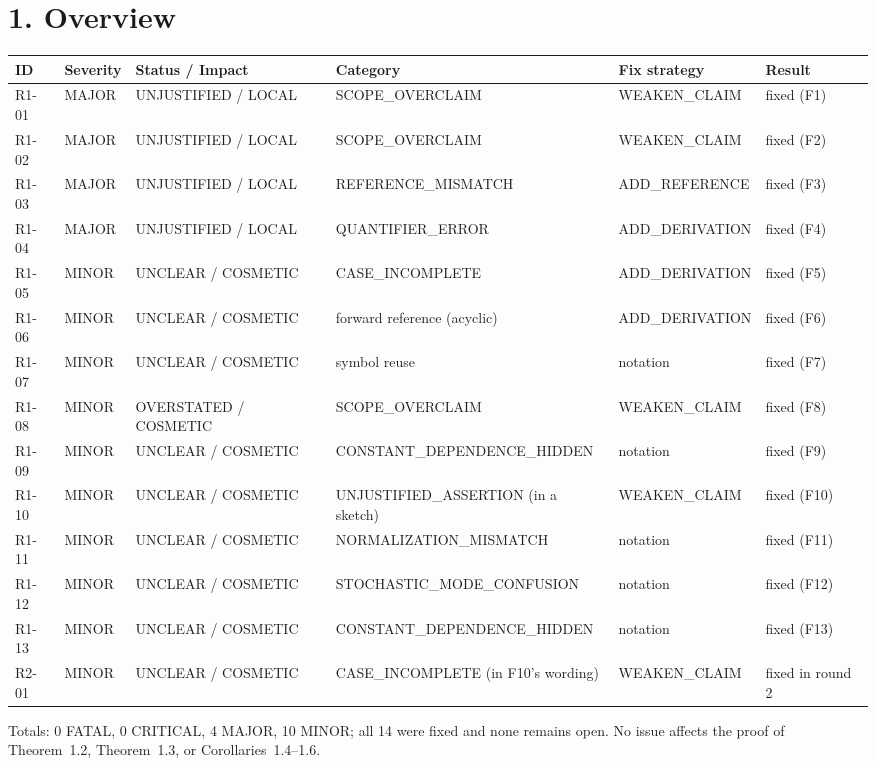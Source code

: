 \documentclass[10pt]{article}
\begin{document}
\section*{1. Overview}
{\footnotesize

\begin{longtable}{@{}>{\raggedright\arraybackslash}p{}>{\raggedright\arraybackslash}p{}>{\raggedright\arraybackslash}p{}>{\raggedright\arraybackslash}p{}>{\raggedright\arraybackslash}p{}>{\raggedright\arraybackslash}p{}@{}}
\toprule
ID & Severity & Status / Impact & Category & Fix strategy & Result\\
\midrule
\endhead
R1-01 & MAJOR & UNJUSTIFIED / LOCAL & SCOPE\_\allowbreak{}OVERCLAIM & WEAKEN\_\allowbreak{}CLAIM & fixed (F1)\\
R1-02 & MAJOR & UNJUSTIFIED / LOCAL & SCOPE\_\allowbreak{}OVERCLAIM & WEAKEN\_\allowbreak{}CLAIM & fixed (F2)\\
R1-03 & MAJOR & UNJUSTIFIED / LOCAL & REFERENCE\_\allowbreak{}MISMATCH & ADD\_\allowbreak{}REFERENCE & fixed (F3)\\
R1-04 & MAJOR & UNJUSTIFIED / LOCAL & QUANTIFIER\_\allowbreak{}ERROR & ADD\_\allowbreak{}DERIVATION & fixed (F4)\\
R1-05 & MINOR & UNCLEAR / COSMETIC & CASE\_\allowbreak{}INCOMPLETE & ADD\_\allowbreak{}DERIVATION & fixed (F5)\\
R1-06 & MINOR & UNCLEAR / COSMETIC & forward reference (acyclic) & ADD\_\allowbreak{}DERIVATION & fixed (F6)\\
R1-07 & MINOR & UNCLEAR / COSMETIC & symbol reuse & notation & fixed (F7)\\
R1-08 & MINOR & OVERSTATED / COSMETIC & SCOPE\_\allowbreak{}OVERCLAIM & WEAKEN\_\allowbreak{}CLAIM & fixed (F8)\\
R1-09 & MINOR & UNCLEAR / COSMETIC & CONSTANT\_\allowbreak{}DEPENDENCE\_\allowbreak{}HIDDEN & notation & fixed (F9)\\
R1-10 & MINOR & UNCLEAR / COSMETIC & UNJUSTIFIED\_\allowbreak{}ASSERTION (in a sketch) & WEAKEN\_\allowbreak{}CLAIM & fixed (F10)\\
R1-11 & MINOR & UNCLEAR / COSMETIC & NORMALIZATION\_\allowbreak{}MISMATCH & notation & fixed (F11)\\
R1-12 & MINOR & UNCLEAR / COSMETIC & STOCHASTIC\_\allowbreak{}MODE\_\allowbreak{}CONFUSION & notation & fixed (F12)\\
R1-13 & MINOR & UNCLEAR / COSMETIC & CONSTANT\_\allowbreak{}DEPENDENCE\_\allowbreak{}HIDDEN & notation & fixed (F13)\\
R2-01 & MINOR & UNCLEAR / COSMETIC & CASE\_\allowbreak{}INCOMPLETE (in F10's wording) & WEAKEN\_\allowbreak{}CLAIM & fixed in round 2\\
\bottomrule
\end{longtable}

}
\noindent Totals: 0 FATAL, 0 CRITICAL, 4 MAJOR, 10 MINOR; all 14 were fixed and none remains open. No issue affects the proof of Theorem~1.2, Theorem~1.3, or Corollaries~1.4--1.6.
\end{document}

